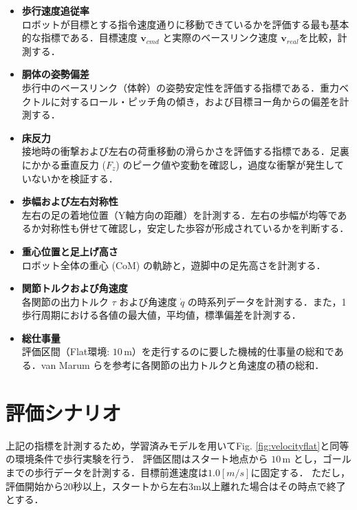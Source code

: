 \begin{itemize}
    \item \textbf{歩行速度追従率} \\
    ロボットが目標とする指令速度通りに移動できているかを評価する最も基本的な指標である．目標速度 $\mathbf{v}_{cmd}$ と実際のベースリンク速度 $\mathbf{v}_{real}$を比較，計測する．

    \item \textbf{胴体の姿勢偏差} \\
    歩行中のベースリンク（体幹）の姿勢安定性を評価する指標である．重力ベクトルに対するロール・ピッチ角の傾き，および目標ヨー角からの偏差を計測する．

    \item \textbf{床反力} \\
    接地時の衝撃および左右の荷重移動の滑らかさを評価する指標である．足裏にかかる垂直反力 ($F_z$) のピーク値や変動を確認し，過度な衝撃が発生していないかを検証する．

    \item \textbf{歩幅および左右対称性} \\
    左右の足の着地位置（Y軸方向の距離）を計測する．左右の歩幅が均等であるか対称性も併せて確認し，安定した歩容が形成されているかを判断する．

    \item \textbf{重心位置と足上げ高さ} \\
    ロボット全体の重心 (CoM) の軌跡と，遊脚中の足先高さを計測する．

    \item \textbf{関節トルクおよび角速度} \\
    各関節の出力トルク $\tau$ および角速度 $\dot{q}$ の時系列データを計測する．また，1歩行周期における各値の最大値，平均値，標準偏差を計測する．

    \item \textbf{総仕事量} \\
    評価区間（Flat環境: $10\,\mathrm{m}$）を走行するのに要した機械的仕事量の総和である．van Marum ら\cite{van2024revisiting}を参考に各関節の出力トルクと角速度の積の総和．
\end{itemize}

\section{評価シナリオ}
上記の指標を計測するため，学習済みモデルを用いてFig. \ref{fig:velocityflat}と同等の環境条件で歩行実験を行う．
評価区間はスタート地点から $10 \, \mathrm{m}$ とし，ゴールまでの歩行データを計測する．目標前進速度は$1.0[m/s]$に固定する．
ただし，評価開始から20秒以上，スタートから左右3m以上離れた場合はその時点で終了とする．

